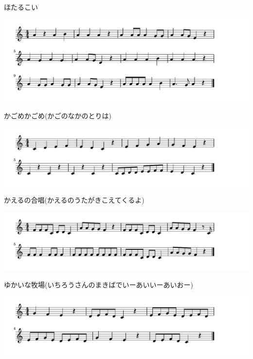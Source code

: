 \documentclass[a4paper]{ltjsarticle}
\begin{document}
\vspace{-10mm} \hspace{10mm}
ほたるこい

\includegraphics[clip]{kagome_crop.pdf}

\vspace{-10mm} \hspace{10mm}
かごめかごめ(かごのなかのとりは)

\includegraphics[clip]{kaerunogassho_crop.pdf}

\vspace{-10mm} \hspace{10mm}
かえるの合唱(かえるのうたがきこえてくるよ)

\includegraphics[clip]{yukainamakiba_crop.pdf}

\vspace{-10mm} \hspace{10mm}
ゆかいな牧場(いちろうさんのまきばでいーあいいーあいおー)

\includegraphics[clip]{bunbunbun_crop.pdf}
\end{document}
